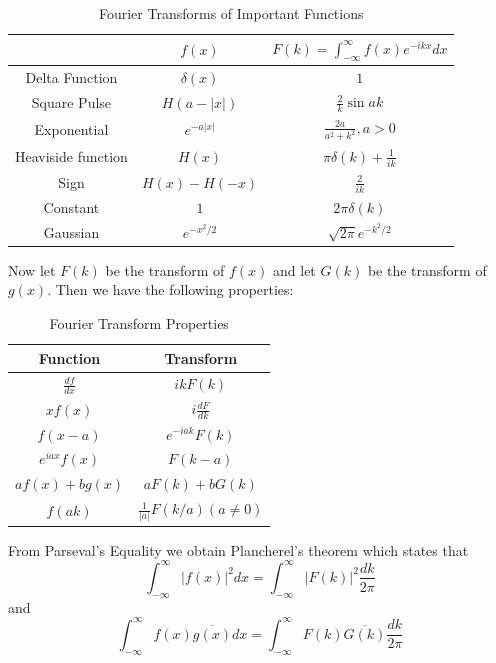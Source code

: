 \documentclass[12pt, a4paper, oneside, openright, titlepage]{book}
\begin{document}
\begin{table}[H]
    \centering
    \caption{Fourier Transforms of Important Functions}
    \begin{tabular}{ccc}
        \hline
        & $f(x)$ & $F(k) = \int_{-\infty}^{\infty}f(x)e^{-ikx}dx$ \\ \hline
        Delta Function & $\delta(x)$ & $1$ \\
        Square Pulse & $H(a-|x|)$ & $\frac{2}{k}\sin ak$ \\
        Exponential & $e^{-a|x|}$ & $\frac{2a}{a^2+k^2}, a > 0$ \\
        Heaviside function & $H(x)$ & $\pi\delta(k) + \frac{1}{ik}$ \\
        Sign & $H(x) - H(-x)$ & $\frac{2}{ik}$ \\
        Constant & $1$ & $2\pi \delta(k)$ \\
        Gaussian & $e^{-x^2/2}$ & $\sqrt{2\pi}e^{-k^2/2}$ \\ \hline
    \end{tabular}
\end{table}

Now let $F(k)$ be the transform of $f(x)$ and let $G(k)$ be the transform of $g(x)$. Then we have the following properties: 

\begin{table}[H]
    \centering 
    \caption{Fourier Transform Properties}
    \begin{tabular}{cc}
        \hline
        Function & Transform \\ \hline
        $\frac{df}{dx}$ & $ikF(k)$ \\
        $xf(x)$ & $i\frac{dF}{dk}$ \\
        $f(x-a)$ & $e^{-iak}F(k)$ \\
        $e^{iax}f(x)$ & $F(k-a)$ \\
        $af(x)+bg(x)$ & $aF(k)+bG(k)$ \\
        $f(ak)$ & $\frac{1}{|a|}F(k/a) (a \neq 0)$ \\ \hline
    \end{tabular}
\end{table}

From Parseval's Equality we obtain Plancherel's theorem which states that \begin{equation*}
    \int_{-\infty}^{\infty}|f(x)|^2dx = \int_{-\infty}^{\infty}|F(k)|^2\frac{dk}{2\pi}
\end{equation*}
and \begin{equation*}
    \int_{-\infty}^{\infty}f(x)\overline{g(x)}dx = \int_{-\infty}^{\infty}F(k)\overline{G(k)}\frac{dk}{2\pi}
\end{equation*}
\end{document}
